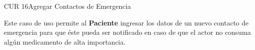 \begin{UseCase}{CUR 16}{Agregar Contactos de Emergencia}
    {
    	Este caso de uso permite al \textbf{Paciente} ingresar los datos de un nuevo contacto de emergencia para que éste pueda ser notificado en caso de que el actor no consuma algún medicamento de alta importancia.  
    	
    }


\end{UseCase}
